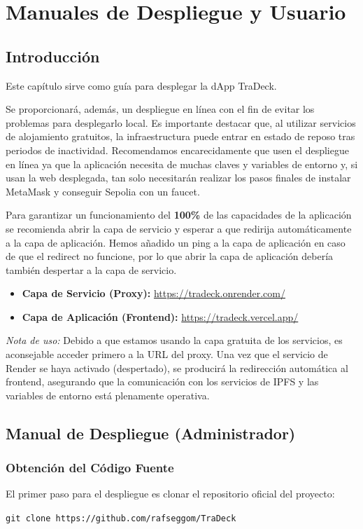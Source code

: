\chapter{Manuales de Despliegue y Usuario}\label{cap:manuales}

\section{Introducción}
Este capítulo sirve como guía para desplegar la dApp TraDeck. 

Se proporcionará, además, un despliegue en línea con el fin de evitar los problemas para desplegarlo local. Es importante destacar que, al utilizar servicios de alojamiento gratuitos, la infraestructura puede entrar en estado de reposo tras periodos de inactividad. Recomendamos encarecidamente que usen el despliegue en línea ya que la aplicación necesita de muchas claves y variables de entorno y, si usan la web desplegada, tan solo necesitarán realizar los pasos finales de instalar MetaMask y conseguir Sepolia con un faucet.

Para garantizar un funcionamiento del \textbf{100\%} de las capacidades de la aplicación se recomienda abrir la capa de servicio y esperar a que redirija automáticamente a la capa de aplicación. Hemos añadido un ping a la capa de aplicación en caso de que el redirect no funcione, por lo que abrir la capa de aplicación debería también despertar a la capa de servicio.

\begin{itemize}
	\item \textbf{Capa de Servicio (Proxy):} \url{https://tradeck.onrender.com/}
	\item \textbf{Capa de Aplicación (Frontend):} \url{https://tradeck.vercel.app/}
\end{itemize}

\textit{Nota de uso:} Debido a que estamos usando la capa gratuita de los servicios, es aconsejable acceder primero a la URL del proxy. Una vez que el servicio de Render se haya activado (despertado), se producirá la redirección automática al frontend, asegurando que la comunicación con los servicios de IPFS y las variables de entorno está plenamente operativa.

\section{Manual de Despliegue (Administrador)}

\subsection{Obtención del Código Fuente}
El primer paso para el despliegue es clonar el repositorio oficial del proyecto:
\begin{center}
	\texttt{git clone https://github.com/rafseggom/TraDeck}
\end{center}

